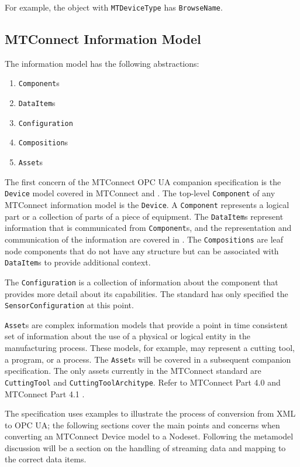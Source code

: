 For example, the object with \texttt{MTDeviceType} has \texttt{BrowseName}.

\FloatBarrier

\subsection{MTConnect Information Model}

The \mtconnect information model has the following abstractions:

\begin{enumerate}
\item \texttt{Component}s
\item \texttt{DataItem}s
\item \texttt{Configuration}
\item \texttt{Composition}s
\item \texttt{Asset}s
\end{enumerate}

The first concern of the MTConnect OPC UA companion specification is the \texttt{Device} model covered in MTConnect \cite{MTCPart2} and \cite{MTCPart3}. The top-level \texttt{Comp\-onent} of any MTConnect information model is the \texttt{Device}. A \texttt{Comp\-onent} represents a logical part or a collection of parts of a piece of equipment. The \texttt{Data\-Item}s represent information that is communicated from \texttt{Component}s, and the representation and communication of the information are covered in \cite{MTCPart3}. The \texttt{Compositions} are leaf node components that do not have any structure but can be associated with \texttt{Data\-Item}s to provide additional context. 

The \texttt{Configuration} is a collection of information about the component that provides more detail about its capabilities. The standard has only specified the \texttt{Sensor\-Configuration} at this point.

\texttt{Asset}s are complex information models that provide a point in time consistent set of information about the use of a physical or logical entity in the manufacturing process. These models, for example, may represent a cutting tool, a program, or a process. The \texttt{Asset}s will be covered in a subsequent companion specification. The only assets currently in the MTConnect standard are \texttt{CuttingTool} and \texttt{CuttingToolArchitype}. Refer to MTConnect Part 4.0 \cite{MTCPart40} and MTConnect Part 4.1 \cite{MTCPart41}.

The specification uses examples to illustrate the process of conversion from XML to OPC UA; the following sections cover the main points and concerns when converting an MTConnect Device model to a Nodeset. Following the metamodel discussion will be a section on the handling of streaming data and mapping to the correct data items. 

